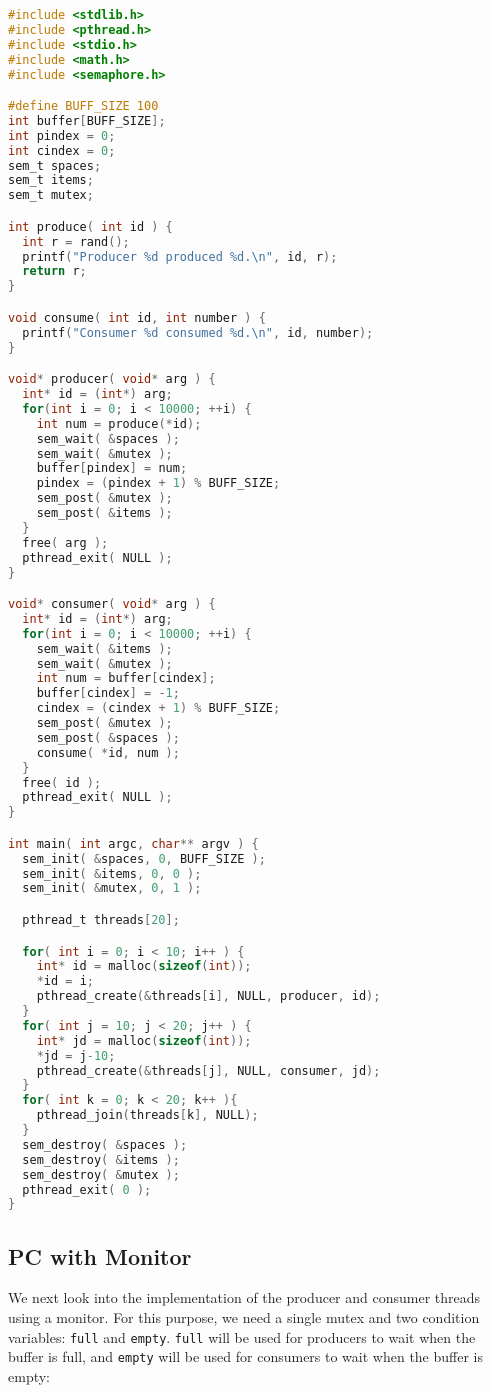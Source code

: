 \begin{lstlisting}[language=C]
#include <stdlib.h>
#include <pthread.h>
#include <stdio.h>
#include <math.h>
#include <semaphore.h>

#define BUFF_SIZE 100
int buffer[BUFF_SIZE];
int pindex = 0;
int cindex = 0;
sem_t spaces;
sem_t items;
sem_t mutex;

int produce( int id ) {
  int r = rand();
  printf("Producer %d produced %d.\n", id, r);
  return r;
}

void consume( int id, int number ) {
  printf("Consumer %d consumed %d.\n", id, number);
}

void* producer( void* arg ) {
  int* id = (int*) arg;
  for(int i = 0; i < 10000; ++i) {
    int num = produce(*id); 
    sem_wait( &spaces );
    sem_wait( &mutex );
    buffer[pindex] = num;
    pindex = (pindex + 1) % BUFF_SIZE;
    sem_post( &mutex );
    sem_post( &items );
  }
  free( arg );
  pthread_exit( NULL );
}

void* consumer( void* arg ) {
  int* id = (int*) arg;
  for(int i = 0; i < 10000; ++i) {
    sem_wait( &items );
    sem_wait( &mutex );
    int num = buffer[cindex];
    buffer[cindex] = -1;
    cindex = (cindex + 1) % BUFF_SIZE;
    sem_post( &mutex );
    sem_post( &spaces );
    consume( *id, num );
  }
  free( id );
  pthread_exit( NULL );
}

int main( int argc, char** argv ) {
  sem_init( &spaces, 0, BUFF_SIZE );
  sem_init( &items, 0, 0 );  
  sem_init( &mutex, 0, 1 );

  pthread_t threads[20];

  for( int i = 0; i < 10; i++ ) {
    int* id = malloc(sizeof(int));
    *id = i;
    pthread_create(&threads[i], NULL, producer, id);
  }
  for( int j = 10; j < 20; j++ ) {
    int* jd = malloc(sizeof(int));
    *jd = j-10;
    pthread_create(&threads[j], NULL, consumer, jd);
  }
  for( int k = 0; k < 20; k++ ){  
    pthread_join(threads[k], NULL);
  }
  sem_destroy( &spaces );
  sem_destroy( &items );
  sem_destroy( &mutex );
  pthread_exit( 0 );
}
\end{lstlisting}


\subsection*{PC with Monitor}

We next look into the implementation of the producer and consumer threads using a monitor.
For this purpose, we need a single mutex and two condition variables: \texttt{full} and \texttt{empty}.
\texttt{full} will be used for producers to wait when the buffer is full, and \texttt{empty} will be used for consumers to wait when the buffer is empty:

